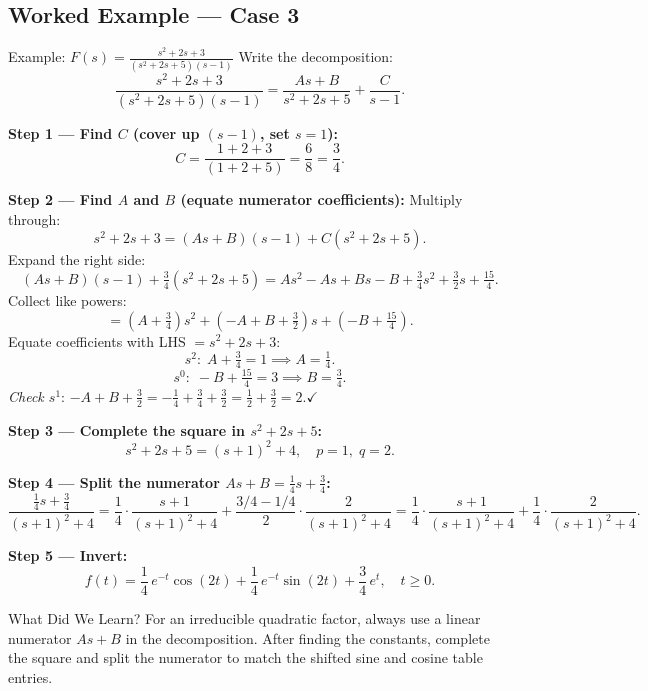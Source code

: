 \documentclass[12pt,a4paper]{article}
\begin{document}
\subsection{Worked Example --- Case 3}
\begin{infobox}{Example: $F(s)=\frac{s^2+2s+3}{(s^2+2s+5)(s-1)}$}
Write the decomposition:
\[
  \frac{s^2+2s+3}{(s^2+2s+5)(s-1)} = \frac{As+B}{s^2+2s+5} + \frac{C}{s-1}.
\]

\textbf{Step 1 --- Find $C$ (cover up $(s-1)$, set $s=1$):}
\[
  C = \frac{1+2+3}{(1+2+5)} = \frac{6}{8} = \frac{3}{4}.
\]

\textbf{Step 2 --- Find $A$ and $B$ (equate numerator coefficients):}
Multiply through:
\[
  s^2+2s+3 = (As+B)(s-1) + C(s^2+2s+5).
\]
Expand the right side:
\[
  (As+B)(s-1) + \tfrac{3}{4}(s^2+2s+5)
  = As^2 - As + Bs - B + \tfrac{3}{4}s^2 + \tfrac{3}{2}s + \tfrac{15}{4}.
\]
Collect like powers:
\[
  = \left(A+\tfrac{3}{4}\right)s^2
    + \left(-A+B+\tfrac{3}{2}\right)s
    + \left(-B+\tfrac{15}{4}\right).
\]
Equate coefficients with LHS $= s^2+2s+3$:
\[
  s^2:\; A+\tfrac{3}{4}=1 \implies A=\tfrac{1}{4}.
\]
\[
  s^0:\; -B+\tfrac{15}{4}=3 \implies B=\tfrac{3}{4}.
\]
\textit{Check $s^1$}: $-A+B+\tfrac{3}{2} = -\tfrac{1}{4}+\tfrac{3}{4}+\tfrac{3}{2}
= \tfrac{1}{2}+\tfrac{3}{2}=2.\checkmark$

\textbf{Step 3 --- Complete the square in $s^2+2s+5$:}
\[
  s^2+2s+5 = (s+1)^2+4, \quad p=1,\; q=2.
\]

\textbf{Step 4 --- Split the numerator $As+B = \tfrac{1}{4}s+\tfrac{3}{4}$:}
\[
  \frac{\tfrac{1}{4}s+\tfrac{3}{4}}{(s+1)^2+4}
  = \frac{1}{4}\cdot\frac{s+1}{(s+1)^2+4}
  + \frac{3/4-1/4}{2}\cdot\frac{2}{(s+1)^2+4}
  = \frac{1}{4}\cdot\frac{s+1}{(s+1)^2+4}
  + \frac{1}{4}\cdot\frac{2}{(s+1)^2+4}.
\]

\textbf{Step 5 --- Invert:}
\[
  f(t) = \frac{1}{4}\,e^{-t}\cos(2t) + \frac{1}{4}\,e^{-t}\sin(2t)
  + \frac{3}{4}\,e^{t},\quad t\geq 0.
\]
\end{infobox}

\begin{learnbox}{What Did We Learn?}
For an irreducible quadratic factor, always use a linear numerator $As+B$
in the decomposition. After finding the constants, complete the square and
split the numerator to match the shifted sine and cosine table entries.
\end{learnbox}

\end{document}
